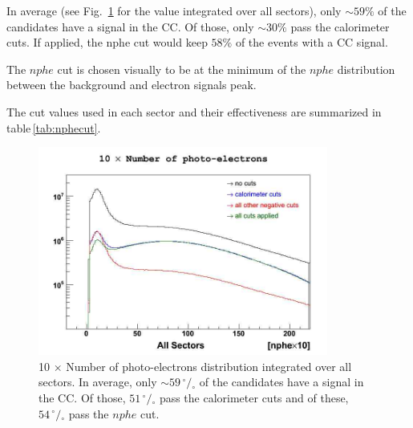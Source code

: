 In average (see Fig.~\ref{fig:cccut_alls} for the value integrated
over all sectors), only $\sim 59\%$ of the candidates have a signal in
the CC. Of those, only $\sim 30\%$ pass the calorimeter cuts. If applied, the nphe cut would keep
$58\%$ of the events with a CC signal.

The $nphe$ cut is chosen visually to be at the minimum
of the $nphe$ distribution between the background and electron signals peak.

The cut values used in each sector and their effectiveness are summarized in 
table\,\ref{tab:nphecut}.
\vspace{0.6cm}
\begin{figure}[ht]
  \centering
		\includegraphics[width=0.85\textwidth ]{img/npe_all_sectors.jpg}
		\caption{10 $\times$ Number of photo-electrons distribution integrated over all sectors.
               In average, only $\sim 59 \,^{\circ\!\!}/\!_\circ$ of the candidates have a signal in
               the CC. Of those, $51 \,^{\circ\!\!}/\!_\circ$ pass the calorimeter cuts and of these, 
               $54 \,^{\circ\!\!}/\!_\circ$ pass the $nphe$ cut.}
 		\label{fig:cccut_alls}
\end{figure}
		
